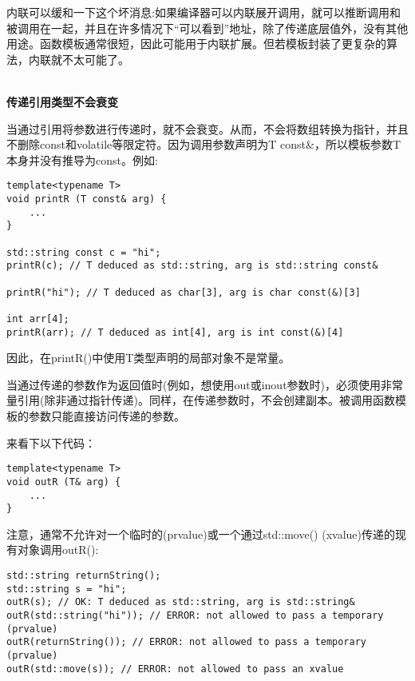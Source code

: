 内联可以缓和一下这个坏消息:如果编译器可以内联展开调用，就可以推断调用和被调用在一起，并且在许多情况下“可以看到”地址，除了传递底层值外，没有其他用途。函数模板通常很短，因此可能用于内联扩展。但若模板封装了更复杂的算法，内联就不太可能了。

\hspace*{\fill} \\ %
\noindent
\textbf{传递引用类型不会衰变}

当通过引用将参数进行传递时，就不会衰变。从而，不会将数组转换为指针，并且不删除const和volatile等限定符。因为调用参数声明为T const\&，所以模板参数T本身并没有推导为const。例如:

\begin{lstlisting}[style=styleCXX]
template<typename T>
void printR (T const& arg) {
	...
}

std::string const c = "hi";
printR(c); // T deduced as std::string, arg is std::string const&

printR("hi"); // T deduced as char[3], arg is char const(&)[3]

int arr[4];
printR(arr); // T deduced as int[4], arg is int const(&)[4]
\end{lstlisting}

因此，在printR()中使用T类型声明的局部对象不是常量。


当通过传递的参数作为返回值时(例如，想使用out或inout参数时)，必须使用非常量引用(除非通过指针传递)。同样，在传递参数时，不会创建副本。被调用函数模板的参数只能直接访问传递的参数。

来看下以下代码：

\begin{lstlisting}[style=styleCXX]
template<typename T>
void outR (T& arg) {
	...
}
\end{lstlisting}

注意，通常不允许对一个临时的(prvalue)或一个通过std::move() (xvalue)传递的现有对象调用outR():

\begin{lstlisting}[style=styleCXX]
std::string returnString();
std::string s = "hi";
outR(s); // OK: T deduced as std::string, arg is std::string&
outR(std::string("hi")); // ERROR: not allowed to pass a temporary (prvalue)
outR(returnString()); // ERROR: not allowed to pass a temporary (prvalue)
outR(std::move(s)); // ERROR: not allowed to pass an xvalue
\end{lstlisting}

